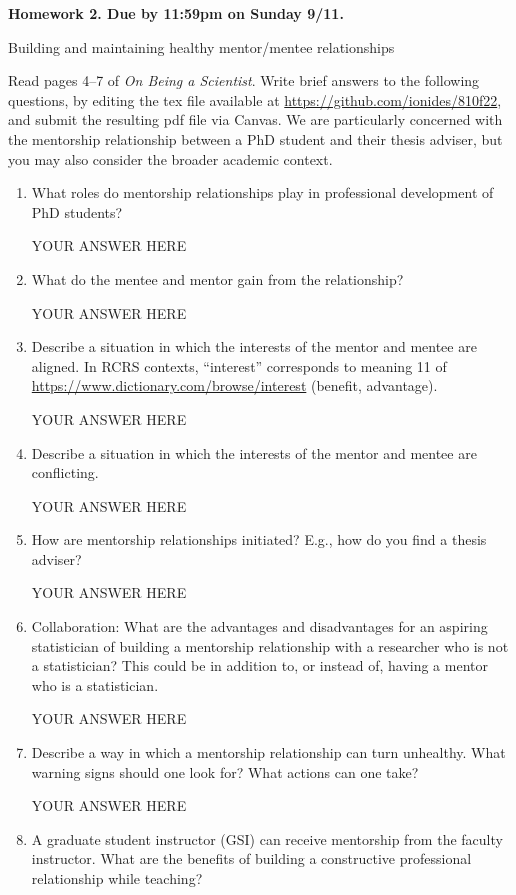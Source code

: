 \documentclass[12pt]{article}
\begin{document}
\begin{center}\bf
Homework 2. Due by 11:59pm on Sunday 9/11.

Building and maintaining healthy mentor/mentee relationships

\end{center}

Read pages 4--7 of {\em On Being a Scientist}. Write brief answers to the following questions, by editing the tex file available at \url{https://github.com/ionides/810f22}, and submit the resulting pdf file via Canvas. We are particularly concerned with the mentorship relationship between a PhD student and their thesis adviser, but you may also consider the broader academic context.

\begin{enumerate}
\item What roles do mentorship relationships play in professional development of PhD students? 

YOUR ANSWER HERE

\item What do the mentee and mentor gain from the relationship?

YOUR ANSWER HERE

\item Describe a situation in which the interests of the mentor and mentee are aligned. In RCRS contexts, ``interest'' corresponds to meaning 11 of \url{https://www.dictionary.com/browse/interest} (benefit, advantage).

YOUR ANSWER HERE

\item Describe a situation in which the interests of the mentor and mentee are conflicting. 

YOUR ANSWER HERE

\item How are mentorship relationships initiated? E.g., how do you find a thesis adviser?

YOUR ANSWER HERE

\item Collaboration: What are the advantages and disadvantages for an aspiring statistician of building a mentorship relationship with a researcher who is not a statistician? This could be in addition to, or instead of, having a mentor who is a statistician.

YOUR ANSWER HERE

\item Describe a way in which a mentorship relationship can turn unhealthy. What warning signs should one look for? What actions can one take?

YOUR ANSWER HERE

\item A graduate student instructor (GSI) can receive mentorship from the faculty instructor. What are the benefits of building a constructive professional relationship while teaching?
  
\end{enumerate}
\end{document}
